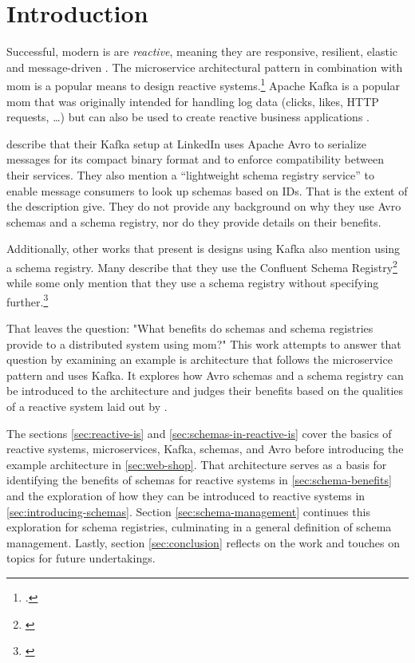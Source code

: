 
\section{Introduction}\label{sec:introduction}

Successful, modern \gls{is} are \emph{reactive}, meaning they are responsive, resilient, elastic and message-driven \parencite{boner_reactive_2014}.
The microservice architectural pattern in combination with \gls{mom} is a popular means to design reactive systems.\footnote{\cites()(85){loukides_microservice_adoption_2020}{fowler_microservices_2014}{boner_reactive_2014}{richardson_microservices_2019}.}
Apache Kafka is a popular \gls{mom} that was originally intended for handling log data (clicks, likes, HTTP requests, \ldots) \parencite{kreps_kafka_2011} but can also be used to create reactive business applications \parencite{stopford_designing_2018}.

\citeauthor[]{kreps_kafka_2011} describe that their Kafka setup at LinkedIn uses Apache Avro to serialize messages for its compact binary format and to enforce compatibility between their services.
They also mention a \enquote{lightweight schema registry service} to enable message consumers to look up schemas based on IDs.
That is the extent of the description \citeauthor[]{kreps_kafka_2011} give.
They do not provide any background on why they use Avro schemas and a schema registry, nor do they provide details on their benefits.
\parencite{kreps_kafka_2011}

Additionally, other works that present \gls{is} designs using Kafka also mention using a schema registry.
Many describe that they use the Confluent Schema Registry\footnote{\cites{radchenko_micro-workflows_2018}{ranjan_radar-base_2019}{korhonen_using_2019}{auer_distributed_2017}{dessalegn_muruts_multi-tenant_2016}}
while some only mention that they use a schema registry without specifying further.\footnote{\cites{g_b_high_2021}{muller_iot_2017}}

That leaves the question: "What benefits do schemas and schema registries provide to a distributed system using \gls{mom}?"
This work attempts to answer that question by examining an example \gls{is} architecture that follows the microservice pattern and uses Kafka.
It explores how Avro schemas and a schema registry can be introduced to the architecture and judges their benefits based on the qualities of a reactive system laid out by \cite{boner_reactive_2014}.

The sections \ref{sec:reactive-is} and \ref{sec:schemas-in-reactive-is} cover the basics of reactive systems, microservices, Kafka, schemas, and Avro before introducing the example architecture in \ref{sec:web-shop}.
That architecture serves as a basis for identifying the benefits of schemas for reactive systems in \ref{sec:schema-benefits} and the exploration of how they can be introduced to reactive systems in \ref{sec:introducing-schemas}.
Section \ref{sec:schema-management} continues this exploration for schema registries, culminating in a general definition of schema management.
Lastly, section \ref{sec:conclusion} reflects on the work and touches on topics for future undertakings.